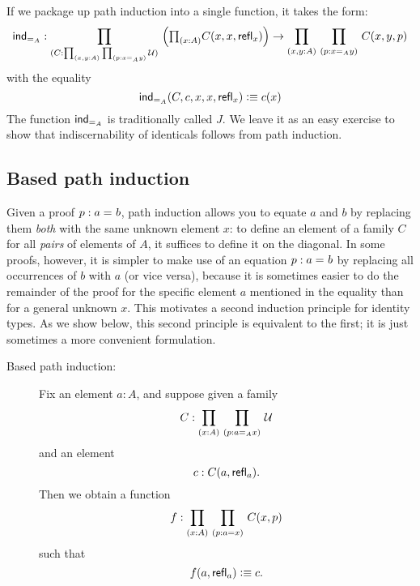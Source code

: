 If we package up path induction into a single function, it takes the form:
\begin{align*}
  \indid{A} :  \dprd{C : \prd{x,y:A}{p:x =_A y} \UU} 
  \Big(\tprd{x:A} C(x,x,\refl{x})\Big) \to  \dprd{x,y:A}{p:x =_A y}   C(x,y,p)
\end{align*}
with the equality
\[ \mathsf{ind}_{=_{A}}(C,c,x,x,\mathsf{refl}_{x}) \vcentcolon\equiv c(x) \]
The function $ \mathsf{ind}_{=_{A}}$ is traditionally called $J$.  We leave it as an easy exercise to show that indiscernability of identicals follows from path induction.  

\subsection{Based path induction}

Given a proof $p : a =_{} b$, 
path induction allows you to equate $a$ and $b$ by replacing them \emph{both} with the same unknown element $x$: to define an element of a family
$C$ for all \emph{pairs} of elements of $A$, it suffices to define it on the  diagonal.
In some proofs, however, it is simpler to make use of an equation $p : a =_{} b$ by replacing all occurrences of $b$ with $a$ (or vice versa), because it is sometimes easier to do the remainder of the proof for the specific element $a$ mentioned in the equality than for a general unknown $x$.  This motivates a second induction principle for identity types.  As we show below, this second principle is equivalent to the first; it is just sometimes a more convenient formulation.

%
\begin{description}
\item[Based path induction:] 
  Fix an element $a:A$, and suppose given a family
  \[ C : \prd{x:A}{p : a =_A x} \UU \]
  and an element
  \[ c : C(a,\mathsf{refl}_{a}). \]
  Then we obtain a function
  \[ f : \prd{x:A}{p:a = x} C(x,p) \]
  such that
  \[ f(a,\mathsf{refl}_{a}) \vcentcolon\equiv c .\]
\end{description}

